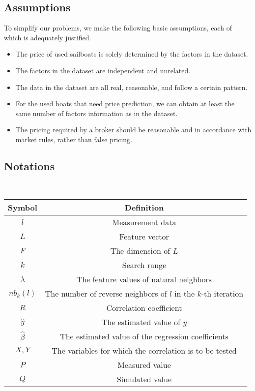\documentclass[12pt]{article}  %
\begin{document}
\subsection{Assumptions}
To simplify our problems, we make the following basic assumptions, each of which is
adequately justified.
\begin{itemize}
    \item The price of used sailboats is solely determined by the factors in the dataset.
    \item The factors in the dataset are independent and unrelated.
    \item The data in the dataset are all real, reasonable, and follow a certain pattern.
    \item For the used boats that need price prediction, we can obtain at least the same number of factors information as in the dataset.
    \item The pricing required by a broker should be reasonable and in accordance with market rules, rather than false pricing.
\end{itemize}
\subsection{Notations}
\ 
\begin{table}[!htbp]
\begin{center}
\begin{tabular}{cc}
	\toprule

	Symbol& Definition\\
	\midrule
	$l$ &Measurement data\\
    \hline
	$L$ &Feature vector\\
    \hline
	$F$ &The dimension of $L$\\
    \hline
    $k$ &Search range\\
    \hline
    $\lambda$ & The feature values of natural neighbors\\
    \hline
    $nb_k(l)$ & The number of reverse neighbors of $l$ in the $k$-th iteration\\
    \hline
    $R$ & Correlation coefficient\\
    \hline
    $\hat{y}$ & The estimated value of $y$\\
    \hline
    $\hat{\beta}$ & The estimated value of the regression coefficients\\
    \hline
    $X, Y$ & The variables for which the correlation is to be tested \\
    \hline
    $P$ & Measured value \\
    \hline
    $Q$ & Simulated value \\ 
	\bottomrule
\end{tabular}
\end{center}
\end{table}
\end{document}
